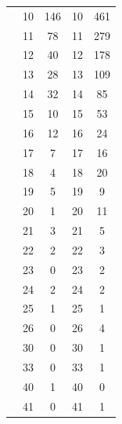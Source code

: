 \begin{table}[htbp]
\begin{tabular}{lcccc}
      & 10 & 146      & 10 & 461\\
      & 11 & 78      & 11 & 279\\
      & 12 & 40      & 12 & 178\\
      & 13 & 28      & 13 & 109\\
      & 14 & 32      & 14 & 85\\
      & 15 & 10      & 15 & 53\\
      & 16 & 12      & 16 & 24\\
      & 17 & 7      & 17 & 16\\
      & 18 & 4      & 18 & 20\\
      & 19 & 5      & 19 & 9\\
      & 20 & 1      & 20 & 11\\
      & 21 & 3      & 21 & 5\\
      & 22 & 2      & 22 & 3\\
      & 23 & 0      & 23 & 2\\
      & 24 & 2      & 24 & 2\\
      & 25 & 1      & 25 & 1\\
      & 26 & 0      & 26 & 4\\
      & 30 & 0      & 30 & 1\\
      & 33 & 0      & 33 & 1\\
      & 40 & 1      & 40 & 0\\
      & 41 & 0      & 41 & 1\\
      \bottomrule
    \end{tabular}
    \label{tab:multibeforesel}
\end{table}

